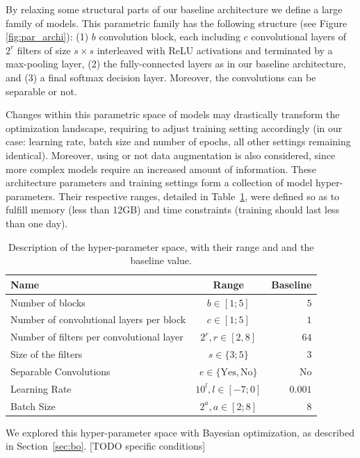 By relaxing some structural parts of our baseline architecture we define a large family of models. This parametric family has the following structure (see Figure \ref{fig:par_archi}): (1) $b$ convolution block, each including $c$ convolutional layers of $2^r$ filters of size $s \times s$ interleaved with ReLU activations and terminated by a max-pooling layer, (2) the fully-connected layers as in our baseline architecture, and (3) a final softmax decision layer. Moreover, the convolutions can be separable or not.

Changes within this parametric space of models may drastically transform the optimization landscape, requiring to adjust training setting accordingly (in our case: learning rate, batch size and number of epochs, all other settings remaining identical). Moreover, using or not data augmentation is also considered, since more complex models require an increased amount of information.
These architecture parameters and training settings form a collection of model hyper-parameters. Their respective ranges, detailed in Table~\ref{table:hyper}, were defined so as to fulfill memory (less than 12GB) and time constraints (training should last less than one day).

\begin{table}
	\centering
	\begin{tabular}{ | l | c | r | }
		\hline
		Name & Range & Baseline \\ \hline
		Number of blocks & $b \in [1 ; 5]$ & $5$ \\
		Number of convolutional layers per block & $c \in [1 ; 5]$ & $1$ \\
		Number of filters per convolutional layer & $2^{r}, r \in [2, 8]$ & $64$ \\
		Size of the filters & $ s \in \{3 ; 5\}$ & $3$ \\
		Separable Convolutions & $e \in \{\text{Yes}, \text{No}\}$ & No \\
		Learning Rate & $10^{l}, l \in [-7 ; 0]$ & $0.001$ \\
		Batch Size & $2^{a}, a \in [2 ; 8]$ & 8 \\
		\hline
	\end{tabular}
	\caption{Description of the hyper-parameter space, with their range and and the baseline value.}
	\label{table:hyper}
\end{table}

We explored this hyper-parameter space with Bayesian optimization, as described in Section~\ref{sec:bo}. [TODO specific conditions]

